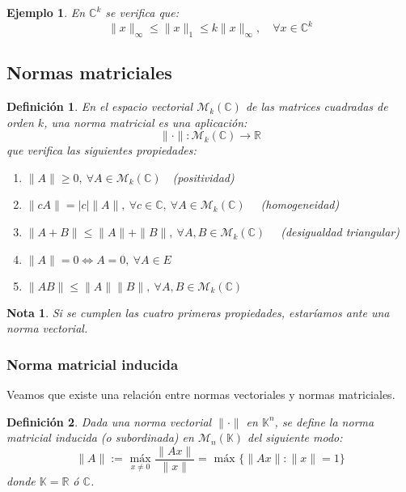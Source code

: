 \documentclass[11pt, a4paper]{article}
\newif\IfInSansMode
\numberwithin{equation}{section}
\theoremstyle{theorem-style}
\theoremstyle{definition-style}
\newtheorem{ndef}{Definición}[section]
\theoremstyle{remark-style}
\newtheorem*{nota}{Nota}
\theoremstyle{example-style}
\newtheorem{ejemplo}{Ejemplo}[section]
\newenvironment{nlist}
{\begin{enumerate}
    \renewcommand\labelenumi{(\emph{\roman{enumi})}}}
  {\end{enumerate}}
\begin{document}
\begin{ejemplo} En $\mathbb{C}^k$ se verifica que: $$\|x\|_\infty \le \|x\|_1 \le k\|x\|_\infty,\quad \forall x \in \mathbb{C}^k$$
	
\end{ejemplo}

\subsection{Normas matriciales}
\label{sub:normas_matriciales}

\begin{ndef}
    En el espacio vectorial $\mathcal M_k(\mathbb C)$ de las matrices cuadradas de orden $k$, una norma matricial es una aplicación: $$\|\cdot\| : \mathcal M_k (\mathbb C) \longrightarrow \mathbb R$$ que verifica las siguientes propiedades:
    \begin{nlist}
		\item $\|A\| \ge 0, \ \forall A \in \mathcal M_k(\mathbb{C})\quad$(positividad)
	\item $\|cA\| = |c|\|A\|, \ \forall c \in \mathbb{C},\ \forall A \in \mathcal M_k(\mathbb{C})\quad$ (homogeneidad)
	\item $\|A + B \| \le \|A\| + \|B\|, \ \forall A,B \in \mathcal M_k(\mathbb{C})\quad$ (desigualdad triangular)
	\item $\|A\| = 0 \iff A = 0,\ \forall A \in E$
	\item $\|A B \| \le \|A\| \|B\|, \ \forall A,B \in \mathcal M_k(\mathbb{C})$
\end{nlist}
\end{ndef}
\begin{nota}
	Si se cumplen las cuatro primeras propiedades, estaríamos ante una norma vectorial.
\end{nota}

\subsubsection{Norma matricial inducida}
\label{ssub:norma_matricial_inducida}

Veamos que existe una relación entre normas vectoriales y normas matriciales.

\begin{ndef}
    Dada una norma vectorial $\|\cdot\|$ en $\mathbb{K}^n$, se define la \textit{norma matricial inducida} (o subordinada) en $\mathcal M_n(\mathbb K)$ del siguiente modo: $$\|A\| := \underset{x\ne 0}{\text{ máx }} \frac{\|Ax\|}{\|x\|} = \text{ máx } \{ \|Ax\| : \|x\| = 1 \}$$ donde $\mathbb K = \mathbb{R}$ ó $\mathbb{C}$.
\end{ndef}
\end{document}
